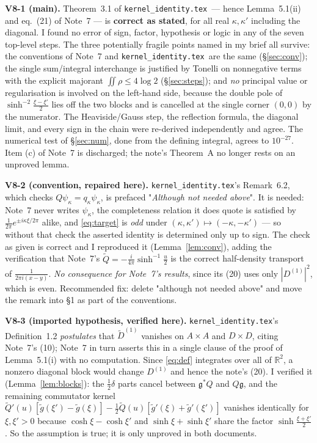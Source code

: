 \documentclass[11pt]{article}
\newcommand{\gt}{\widetilde g}\newcommand{\gh}{\widehat g}\newcommand{\gfr}{\mathfrak g}
\newcommand{\Dt}{\widetilde D^{(1)}}\newcommand{\Qt}{\widetilde Q}
\newcommand{\KI}{\texttt{kernel\_identity.tex}}\newcommand{\NOTE}{\texttt{universality\_normalization.tex}}
\begin{document}
\begin{verdictok}
\textbf{V8-1 (main).}  Theorem~3.1 of \KI\ --- hence Lemma~5.1(ii) and eq.~(21) of Note~7 --- is
\textbf{correct as stated}, for all real \(\kappa,\kappa'\) including the diagonal.  I found no
error of sign, factor, hypothesis or logic in any of the seven top-level steps.  The three
potentially fragile points named in my brief all survive: the conventions of Note~7 and \KI\ are
the same (\S\ref{sec:conv}); the single sum/integral interchange is justified by Tonelli on
nonnegative terms with the explicit majorant \(\iint\rho\le4\log2\) (\S\ref{sec:steps}); and
\emph{no} principal value or regularisation is involved on the left-hand side, because the double
pole of \(\sinh^{-2}\frac{\xi-\xi'}2\) lies off the two blocks and is cancelled at the single
corner \((0,0)\) by the numerator.  The Heaviside/Gauss step, the reflection formula, the diagonal
limit, and every sign in the chain were re-derived independently and agree.  The numerical test of
\S\ref{sec:num}, done from the defining integral, agrees to \(10^{-27}\).  Item (c) of Note~7 is
discharged; the note's Theorem~A no longer rests on an unproved lemma.
\end{verdictok}

\begin{verdictgap}
\textbf{V8-2 (convention, repaired here).}  \KI's Remark~6.2, which checks
\(Q\psi_\kappa=q_\kappa\psi_\kappa\), is prefaced "\emph{Although not needed above}".  It is
needed: Note~7 never writes \(\psi_\kappa\), the completeness relation it does quote is satisfied
by \(\frac1{2\pi}e^{\pm i\kappa\xi/2\pi}\) alike, and \eqref{eq:target} is \emph{odd} under
\((\kappa,\kappa')\mapsto(-\kappa,-\kappa')\) --- so without that check the asserted identity is
determined only up to sign.  The check as given is correct and I reproduced it
(Lemma~\ref{lem:conv}), adding the verification that Note~7's \(\Qt=-\frac i{4\pi}\sinh^{-1}\frac
u2\) is the correct half-density transport of \(\frac1{2\pi i(x-y)}\).  \emph{No consequence for
Note~7's results}, since its (20) uses only \(|D^{(1)}|^2\), which is even.  Recommended fix:
delete "although not needed above" and move the remark into \S1 as part of the conventions.
\end{verdictgap}

\begin{verdictgap}
\textbf{V8-3 (imported hypothesis, verified here).}  \KI's Definition~1.2 \emph{postulates} that
\(\Dt\) vanishes on \(A\times A\) and \(D\times D\), citing Note~7's (10); Note~7 in turn asserts
this in a single clause of the proof of Lemma~5.1(i) with no computation.  Since \eqref{eq:def}
integrates over all of \(\mathbb R^2\), a nonzero diagonal block would change \(D^{(1)}\) and hence
the note's (20).  I verified it (Lemma~\ref{lem:blocks}): the \(\frac12\delta\) parts cancel
between \(\gfr^*Q\) and \(Q\gfr\), and the remaining commutator kernel
\(\Qt'(u)[\gt(\xi')-\gt(\xi)]-\frac12\Qt(u)[\gt'(\xi)+\gt'(\xi')]\) vanishes identically for
\(\xi,\xi'>0\) because \(\cosh\xi-\cosh\xi'\) and \(\sinh\xi+\sinh\xi'\) share the factor
\(\sinh\frac{\xi+\xi'}2\).  So the assumption is true; it is only unproved in both documents.
\end{verdictgap}
\end{document}

